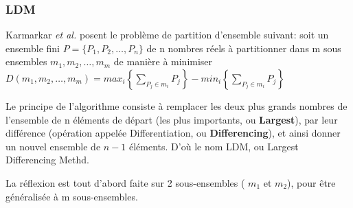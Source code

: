 \documentclass[a4paper,12pt]{report}
\theoremstyle{plain}				%
\theoremstyle{definition}				%
\begin{document}
\subsubsection{LDM}


Karmarkar \emph{et al.}
\cite{karmarkar1982differencing} posent le problème de partition
d'ensemble suivant: soit un ensemble fini
$P=\{P_1, P_2, \ldots, P_n\}$ de n nombres réels à partitionner dans m
sous ensembles $m_1, m_2, \ldots, m_m$ de manière à minimiser
$D(m_1, m_2, \ldots, m_m) = max_i \left\{ \sum_{P_j \in m_i}P_j
\right\} - min_i \left\{ \sum_{P_j \in m_i}P_j \right\}$

Le principe de l'algorithme consiste à remplacer les deux plus grands
nombres de l'ensemble de n éléments de départ (les plus importants, ou
\textbf{Largest}), par leur différence (opération appelée
Differentiation, ou \textbf{Differencing}), et ainsi donner un nouvel
ensemble de $n-1$ éléments.
D'où le nom LDM, ou Largest Differencing Methd.


La réflexion est tout d'abord faite sur 2 sous-ensembles ( $m_1$ et
$m_2$), pour être généralisée à m sous-ensembles.
\end{document}
